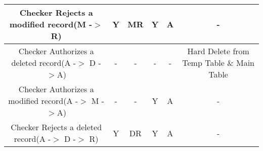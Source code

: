 \begin{adjustbox}{angle=270}
\begin{tabular}{|c|c|c|c|c|c|}
Checker Rejects a modified record(M -$>$ R)   & Y          & MR         & Y          & A	& -       \\ \hline
Checker Authorizes a deleted record(A -$>$ D -$>$A)   & -          & -         & -          & -	& Hard Delete from Temp Table \& Main Table   \\ \hline
Checker Authorizes a modified record(A -$>$ M -$>$A)   & -          & -         & Y          & A	& -      \\ \hline
Checker Rejects a deleted record(A -$>$ D -$>$ R)   & Y 	& DR	& Y	& A	& -	\\ \hline
\end{tabular}
\end{adjustbox}